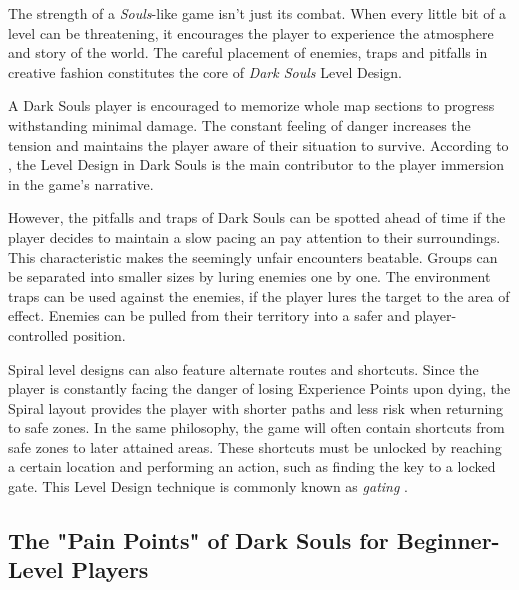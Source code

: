 The strength of a \emph{Souls}-like game isn't just its combat. When every little bit of a level can be threatening, it encourages the player to experience the atmosphere and story of the world. The careful placement of enemies, traps and pitfalls in creative fashion constitutes the core of \emph{Dark Souls} Level Design.

A Dark Souls player is encouraged to memorize whole map sections to progress withstanding minimal damage. The constant feeling of danger increases the tension and maintains the player aware of their situation to survive. According to , the Level Design in  Dark Souls is the main contributor to the player immersion in the game's narrative.

However, the pitfalls and traps of Dark Souls can be spotted ahead of time if the player decides to maintain a slow pacing an pay attention to their surroundings. This characteristic makes the seemingly unfair encounters beatable. Groups can be separated into smaller sizes by luring enemies one by one. The environment traps can be used against the enemies, if the player lures the target to the area of effect. Enemies can be pulled from their territory into a safer and player-controlled position.

Spiral level designs can also feature alternate routes and shortcuts. Since the player is constantly facing the danger of losing Experience Points upon dying, the Spiral layout provides the player with shorter paths and less risk when returning to safe zones. In the same philosophy, the game will often contain shortcuts from safe zones to later attained areas. These shortcuts must be unlocked by reaching a certain location and performing an action, such as finding the key to a locked gate. This Level Design technique is commonly known as \emph{gating} \cite{BOOK_LevelUpTheGuideToGreat}.


\subsection{The "Pain Points" of Dark Souls for Beginner-Level Players}


